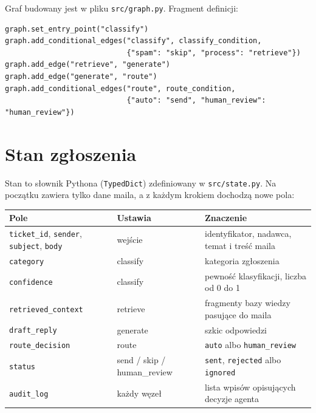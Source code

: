\documentclass[11pt,a4paper]{article}
\newcommand{\plik}[1]{\texttt{#1}}
\begin{document}
Graf budowany jest w pliku \plik{src/graph.py}. Fragment definicji:

\begin{lstlisting}
graph.set_entry_point("classify")
graph.add_conditional_edges("classify", classify_condition,
                            {"spam": "skip", "process": "retrieve"})
graph.add_edge("retrieve", "generate")
graph.add_edge("generate", "route")
graph.add_conditional_edges("route", route_condition,
                            {"auto": "send", "human_review": "human_review"})
\end{lstlisting}

\section{Stan zgłoszenia}
\label{sec:stan}

Stan to słownik Pythona (\texttt{TypedDict}) zdefiniowany w
\plik{src/state.py}. Na początku zawiera tylko dane maila, a z każdym
krokiem dochodzą nowe pola:

\begin{center}
\renewcommand{\arraystretch}{1.2}
\begin{tabularx}{\textwidth}{@{}>{\raggedright\arraybackslash}p{4.2cm} >{\raggedright\arraybackslash}p{2.6cm} X@{}}
\toprule
\textbf{Pole} & \textbf{Ustawia} & \textbf{Znaczenie} \\
\midrule
\texttt{ticket\_id}, \texttt{sender}, \texttt{subject}, \texttt{body}
  & wejście & identyfikator, nadawca, temat i treść maila \\
\texttt{category} & classify & kategoria zgłoszenia \\
\texttt{confidence} & classify & pewność klasyfikacji, liczba od 0 do 1 \\
\texttt{retrieved\_context} & retrieve & fragmenty bazy wiedzy pasujące do maila \\
\texttt{draft\_reply} & generate & szkic odpowiedzi \\
\texttt{route\_decision} & route & \texttt{auto} albo \texttt{human\_review} \\
\texttt{status} & send / skip / human\_review & \texttt{sent}, \texttt{rejected}
  albo \texttt{ignored} \\
\texttt{audit\_log} & każdy węzeł & lista wpisów opisujących decyzje agenta \\
\bottomrule
\end{tabularx}
\end{center}
\end{document}
